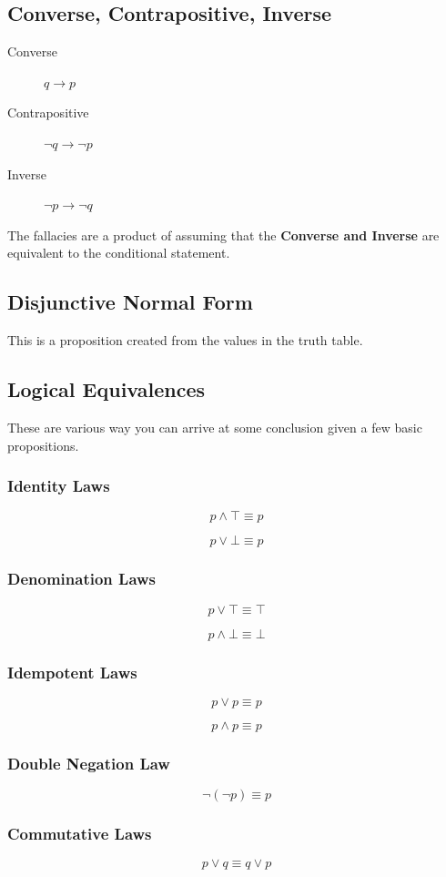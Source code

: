 \documentclass[11pt]{article}
\begin{document}
\subsection{Converse, Contrapositive, Inverse}
\label{sec:org3739445}
\begin{description}
\item[{Converse}] \(q \to p\)
\item[{Contrapositive}] \(\neg q \to \neg p\)
\item[{Inverse}] \(\neg p \to \neg q\)
\end{description}

The fallacies are a product of assuming that the \textbf{Converse and Inverse} are equivalent to the conditional statement.
\subsection{Disjunctive Normal Form}
\label{sec:org5490d3f}
This is a proposition created from the values in the truth table.

\subsection{Logical Equivalences}
\label{sec:org8067ec4}
These are various way you can arrive at some conclusion given a few basic propositions.
\subsubsection{Identity Laws}
\label{sec:org714fea5}
\[
p \land \top \equiv p
\]

\[
p \lor \bot \equiv p
\]
\subsubsection{Denomination Laws}
\label{sec:orgaf01463}
\[
p \lor \top \equiv \top
\]

\[
p \land \bot \equiv \bot
\]
\subsubsection{Idempotent Laws}
\label{sec:org9f01ea5}
\[
p \lor p \equiv p
\]

\[
p \land p \equiv p
\]
\subsubsection{Double Negation Law}
\label{sec:org80e86fc}
\[
\neg ( \neg p) \equiv p
\]
\subsubsection{Commutative Laws}
\label{sec:org84ea1dd}
\[
p \lor q \equiv q \lor p
\]
\end{document}
